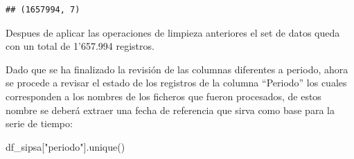 \documentclass[
]{book}
\newenvironment{Shaded}{\begin{snugshade}}{\end{snugshade}}
\newcommand{\NormalTok}[1]{#1}
\newcommand{\StringTok}[1]{\textcolor[rgb]{0.31,0.60,0.02}{#1}}
\begin{document}
\begin{verbatim}
## (1657994, 7)
\end{verbatim}

Despues de aplicar las operaciones de limpieza anteriores el set de datos queda con un total de 1'657.994 registros.

Dado que se ha finalizado la revisión de las columnas diferentes a periodo, ahora se procede a revisar el estado de los registros de la columna ``Periodo'' los cuales corresponden a los nombres de los ficheros que fueron procesados, de estos nombre se deberá extraer una fecha de referencia que sirva como base para la serie de tiempo:

\begin{Shaded}
\begin{Highlighting}[]

\NormalTok{df\_sipsa[}\StringTok{"periodo"}\NormalTok{].unique()}
\end{Highlighting}
\end{Shaded}
\end{document}
